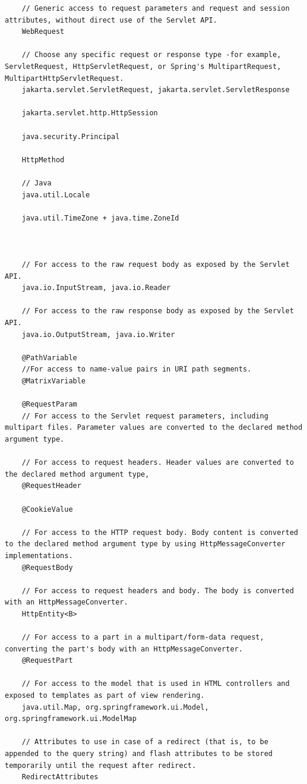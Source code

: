 \documentclass{scrartcl}
\begin{document}
    \begin{lstlisting}
    // Generic access to request parameters and request and session attributes, without direct use of the Servlet API.
    WebRequest

    // Choose any specific request or response type -for example, ServletRequest, HttpServletRequest, or Spring's MultipartRequest, MultipartHttpServletRequest.
    jakarta.servlet.ServletRequest, jakarta.servlet.ServletResponse

    jakarta.servlet.http.HttpSession

    java.security.Principal

    HttpMethod

    // Java
    java.util.Locale

    java.util.TimeZone + java.time.ZoneId



    // For access to the raw request body as exposed by the Servlet API.
    java.io.InputStream, java.io.Reader

    // For access to the raw response body as exposed by the Servlet API.
    java.io.OutputStream, java.io.Writer

    @PathVariable
    //For access to name-value pairs in URI path segments.
    @MatrixVariable

    @RequestParam
    // For access to the Servlet request parameters, including multipart files. Parameter values are converted to the declared method argument type.

    // For access to request headers. Header values are converted to the declared method argument type,
    @RequestHeader

    @CookieValue

    // For access to the HTTP request body. Body content is converted to the declared method argument type by using HttpMessageConverter implementations.
    @RequestBody

    // For access to request headers and body. The body is converted with an HttpMessageConverter.
    HttpEntity<B>

    // For access to a part in a multipart/form-data request, converting the part's body with an HttpMessageConverter.
    @RequestPart

    // For access to the model that is used in HTML controllers and exposed to templates as part of view rendering.
    java.util.Map, org.springframework.ui.Model, org.springframework.ui.ModelMap

    // Attributes to use in case of a redirect (that is, to be appended to the query string) and flash attributes to be stored temporarily until the request after redirect.
    RedirectAttributes


\end{lstlisting}
\end{document}
